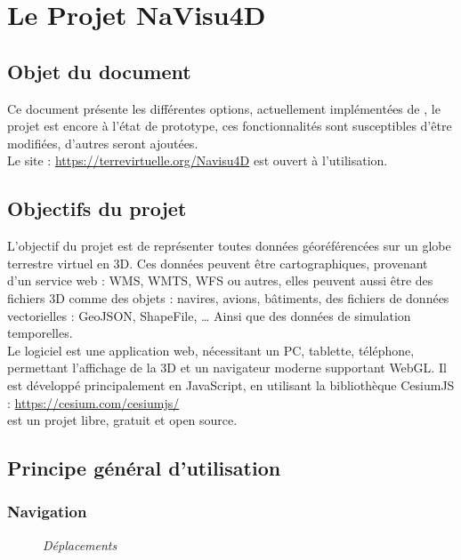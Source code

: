 
\chapter{Le Projet NaVisu4D}
\section{Objet du document}
Ce document présente les différentes options, actuellement implémentées de 
\nav, le projet est encore à l'état de prototype, ces fonctionnalités sont susceptibles d'être modifiées, d'autres seront ajoutées. \\
Le site : \href{https://terrevirtuelle.org/Navisu4D}{https://terrevirtuelle.org/Navisu4D} est ouvert à l'utilisation.
\section{Objectifs du projet}
L'objectif du projet \nav est de représenter toutes données géoréférencées sur un globe terrestre virtuel en 3D. 
Ces données peuvent être cartographiques, provenant d'un service web : WMS, WMTS, WFS ou autres, elles peuvent aussi être des fichiers 3D comme des objets : navires, avions, bâtiments, des fichiers de données vectorielles : GeoJSON, ShapeFile, \ldots
Ainsi que des données de simulation temporelles.\\
Le logiciel \nav est une application web, nécessitant  un PC, tablette, téléphone, permettant l'affichage de la 3D et un navigateur moderne supportant WebGL. Il est développé principalement en JavaScript, en utilisant la bibliothèque CesiumJS : \href{https://cesium.com/cesiumjs/}{https://cesium.com/cesiumjs/}\\
\nav est un projet libre, gratuit et open source.
\section{Principe général d'utilisation}
 \subsection{Navigation}
\begin{center}
\begin{figure}[ht]
\caption{\label{equiProj}\textit{Déplacements}}
\end{figure}
\end{center}
\newpage
